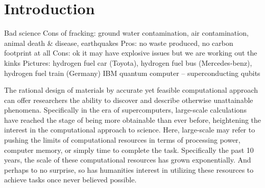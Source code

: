 \chapter{Introduction}

Bad science
Cons of fracking: ground water contamination, air contamination, animal death & disease, earthquakes
Pros: no waste produced, no carbon footprint at all
Cons: ok it may have explosive issues but we are working out the kinks
Pictures: hydrogen fuel car (Toyota), hydrogen fuel bus (Mercedes-benz), hydrogen fuel train (Germany)
IBM quantum computer – superconducting qubits


% 
The rational design of materials by accurate yet feasible computational approach can offer researchers the ability to discover and describe otherwise unattainable phenomena. Specifically in the era of supercomputers, large-scale calculations have reached the stage of being more obtainable than ever before, heightening the interest in the computational approach to science. Here, large-scale may refer to pushing the limits of computational resources in terms of processing power, computer memory, or simply time to complete the task. Specifically the past 10 years, the scale of these computational resources has grown exponentially. And perhaps to no surprise, so has humanities interest in utilizing these resources to achieve tasks once never believed possible.


